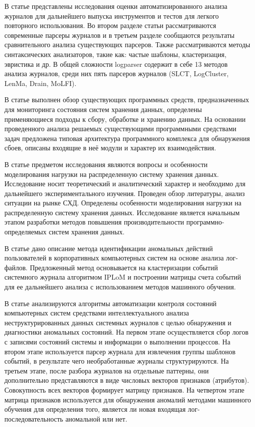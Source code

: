 \documentclass[12pt,a4paper]{article}
\begin{document}
В статье \cite{Article1} представлены исследования оценки автоматизированного анализа журналов для дальнейшего выпуска инструментов и тестов для легкого повторного использования. Во втором разделе статьи рассматриваются современные парсеры журналов и в третьем разделе сообщаются результаты сравнительного анализа существующих парсеров. Также рассматриваются методы синтаксических анализаторов, такие как: частые шаблоны, кластеризация, эвристика и др. В общей сложности logparser содержит в себе 13 методов анализа журналов, среди них пять парсеров журналов (SLCT, LogCluster, LenMa, Drain, MoLFI).

В статье \cite{Article2} выполнен обзор существующих программных средств, предназначенных для мониторинга состояния систем хранения данных, определены применяющиеся подходы к сбору, обработке и хранению данных. На основании проведенного анализа решаемых существующими программными средствами задач предложена типовая архитектура программного комплекса для обнаружения сбоев, описаны входящие в неё модули и характер их взаимодействия.

В статье \cite{Article3} предметом исследования являются вопросы и особенности моделирования нагрузки на распределенную систему хранения данных. Исследование носит теоретический и аналитический характер и необходимо для дальнейшего экспериментального изучения. Проведен обзор литературы, анализ ситуации на рынке СХД. Определены особенности моделирования нагрузки на распределенную систему хранения данных. Исследование является начальным этапом разработки методов повышения производительности программно-определяемых систем хранения данных.

В статье \cite{Article4} дано описание метода идентификации аномальных действий пользователей в корпоративных компьютерных систем на основе анализа лог-файлов. Предложенный метод основывается на кластеризации событий системного журнала алгоритмом IPLoM и построении матрицы счета событий для ее дальнейшего анализа с использованием методов машинного обучения.

В статье \cite{Article5} анализируются алгоритмы автоматизации контроля состояний компьютерных систем средствами интеллектуального анализа неструктурированных данных системных журналов с целью обнаружения и диагностики аномальных состояний. На первом этапе осуществляется сбор логов с записями состояний системы и информации о выполнении процессов. На втором этапе используется парсер журнала для извлечения группы шаблонов событий, в результате чего необработанные журналы структурируются. На третьем этапе, после разбора журналов на отдельные паттерны, они дополнительно представляются в виде числовых векторов признаков (атрибутов). Совокупность всех векторов формирует матрицу признаков. На четвертом этапе матрица признаков используется для обнаружения аномалий методами машинного обучения для определения того, является ли новая входящая лог-последовательность аномальной или нет.
\end{document}
